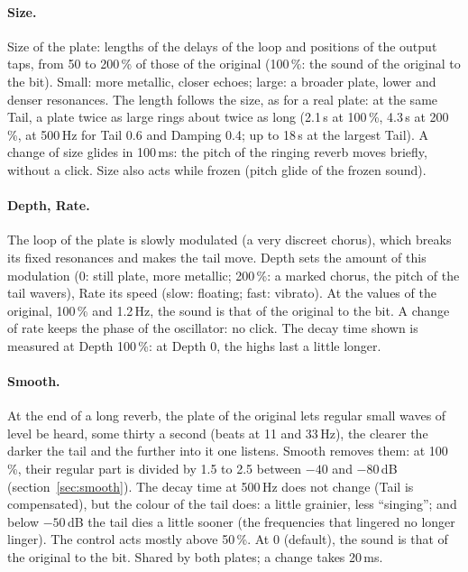 \documentclass[a4paper,11pt]{article}
\newcommand{\dB}{\,dB}
\begin{document}
\paragraph{Size.} Size of the plate: lengths of the delays of the loop and positions of the
output taps, from 50 to 200\,\% of those of the original (100\,\%: the sound of the original to
the bit). Small: more metallic, closer echoes; large: a broader plate, lower and denser
resonances. The length follows the size, as for a real plate: at the same Tail, a plate twice
as large rings about twice as long (2.1\,s at 100\,\%, 4.3\,s at 200\,\%, at 500\,Hz for Tail
0.6 and Damping 0.4; up to 18\,s at the largest Tail). A change of size glides in 100\,ms: the
pitch of the ringing reverb moves briefly, without a click. Size also acts while frozen (pitch
glide of the frozen sound).

\paragraph{Depth, Rate.} The loop of the plate is slowly modulated (a very discreet chorus),
which breaks its fixed resonances and makes the tail move. Depth sets the amount of this
modulation (0: still plate, more metallic; 200\,\%: a marked chorus, the pitch of the tail
wavers), Rate its speed (slow: floating; fast: vibrato). At the values of the original,
100\,\% and 1.2\,Hz, the sound is that of the original to the bit. A change of rate keeps the
phase of the oscillator: no click. The decay time shown is measured at Depth 100\,\%: at
Depth 0, the highs last a little longer.

\paragraph{Smooth.} At the end of a long reverb, the plate of the original lets regular small
waves of level be heard, some thirty a second (beats at 11 and 33\,Hz), the clearer the darker
the tail and the further into it one listens. Smooth removes them: at 100\,\%, their regular
part is divided by 1.5 to 2.5 between $-40$ and $-80$\dB{} (section~\ref{sec:smooth}). The
decay time at 500\,Hz does not change (Tail is compensated), but the colour of the tail does: a
little grainier, less ``singing''; and below $-50$\dB{} the tail dies a little sooner (the
frequencies that lingered no longer linger). The control acts mostly above 50\,\%. At 0 (default), the
sound is that of the original to the bit. Shared by both plates; a change takes 20\,ms.
\end{document}

